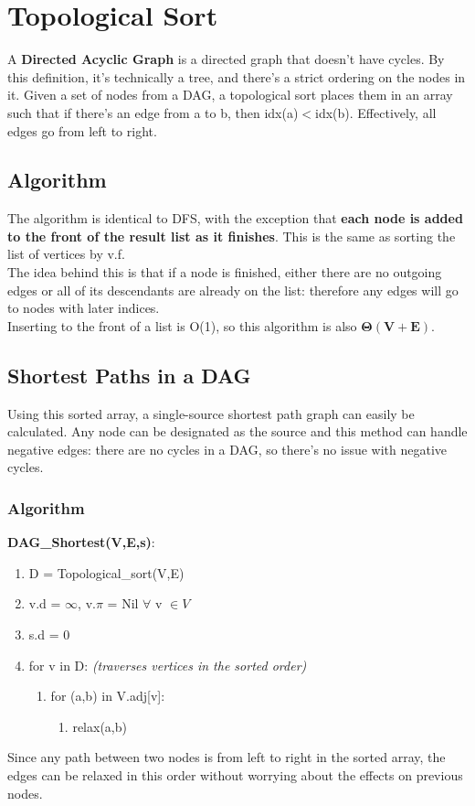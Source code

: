 \section{Topological Sort}
A \textbf{Directed Acyclic Graph} is a directed graph that doesn't have cycles. By this definition, it's technically a tree, and there's a strict ordering on the nodes in it. Given a set of nodes from a DAG, a topological sort places them in an array such that if there's an edge from a to b, then idx(a)$<$idx(b). Effectively, all edges go from left to right. 

\subsection{Algorithm}
The algorithm is identical to DFS, with the exception that \textbf{each node is added to the front of the result list as it finishes}. This is the same as sorting the list of vertices by v.f. \\
The idea behind this is that if a node is finished, either there are no outgoing edges or all of its descendants are already on the list: therefore any edges will go to nodes with later indices. \\
Inserting to the front of a list is O(1), so this algorithm is also $\boldsymbol{\Theta(V+E)}$.

\subsection{Shortest Paths in a DAG}
Using this sorted array, a single-source shortest path graph can easily be calculated. Any node can be designated as the source and this method can handle negative edges: there are no cycles in a DAG, so there's no issue with negative cycles.

\subsubsection{Algorithm}
\textbf{DAG\_Shortest(V,E,s)}:
\begin{enumerate}[label=\Alph*]
    \item D = Topological\_sort(V,E)
    \item v.d = $\infty$, v.$\pi$ = Nil $\forall$ v $\in V$
    \item s.d = 0
    \item for v in D: \emph{(traverses vertices in the sorted order)}
\begin{enumerate}[label=\arabic*]
    \item [] for (a,b) in V.adj[v]:
    \begin{enumerate}
        \item [] relax(a,b)
    \end{enumerate}
\end{enumerate}    
\end{enumerate}
Since any path between two nodes is from left to right in the sorted array, the edges can be relaxed in this order without worrying about the effects on previous nodes. 